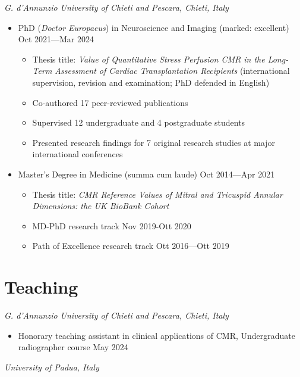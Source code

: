 \documentclass[
  11pt,
]
{article}
\providecommand{\tightlist}{%
  \setlength{\itemsep}{0pt}\setlength{\parskip}{0pt}}
\begin{document}
\emph{G. d'Annunzio University of Chieti and Pescara, Chieti, Italy}

\begin{itemize}
\tightlist
\item
  PhD (\emph{Doctor Europaeus}) in Neuroscience and Imaging (marked:
  excellent) \hfill Oct 2021---Mar 2024

  \begin{itemize}
  \tightlist
  \item
    Thesis title: \emph{Value of Quantitative Stress Perfusion CMR in
    the Long-Term Assessment of Cardiac Transplantation Recipients}
    (international supervision, revision and examination; PhD defended
    in English)
  \item
    Co-authored 17 peer-reviewed publications
  \item
    Supervised 12 undergraduate and 4 postgraduate students
  \item
    Presented research findings for 7 original research studies at major
    international conferences
  \end{itemize}
\item
  Master's Degree in Medicine (summa cum laude) \hfill Oct 2014---Apr
  2021

  \begin{itemize}
  \tightlist
  \item
    Thesis title: \emph{CMR Reference Values of Mitral and Tricuspid
    Annular Dimensions: the UK BioBank Cohort}
  \item
    MD-PhD research track \hfill Nov 2019-Ott 2020
  \item
    Path of Excellence research track \hfill Ott 2016---Ott 2019
  \end{itemize}
\end{itemize}

\section{Teaching}\label{teaching}

\emph{G. d'Annunzio University of Chieti and Pescara, Chieti, Italy}

\begin{itemize}
\tightlist
\item
  Honorary teaching assistant in clinical applications of CMR,
  Undergraduate radiographer course \hfill May 2024
\end{itemize}

\emph{University of Padua, Italy}
\end{document}
